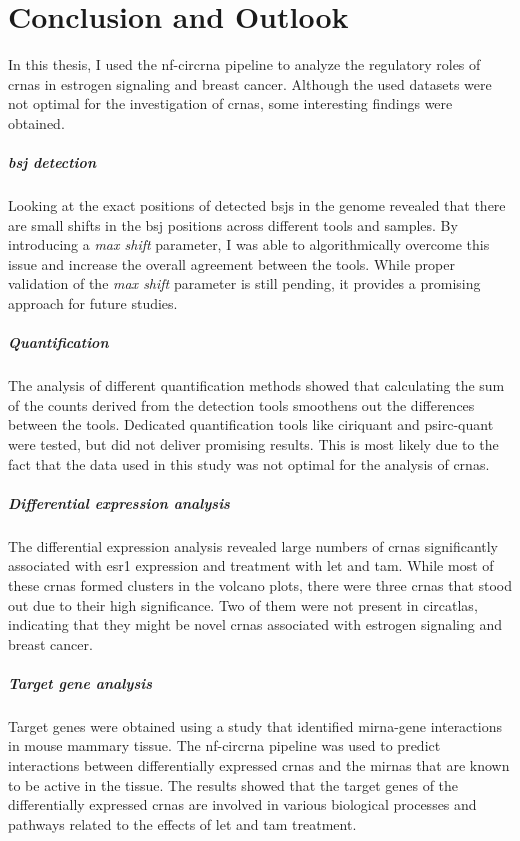 \chapter{Conclusion and Outlook}

In this thesis, I used the \gls{nf-circrna} pipeline to analyze the regulatory
roles of \glspl{crna} in estrogen signaling and breast cancer.
Although the used datasets were not optimal for the investigation of
\glspl{crna}, some interesting findings were obtained.

\paragraph{\Gls{bsj} detection}
Looking at the exact positions of detected \glspl{bsj} in the genome revealed
that there are small shifts in the \gls{bsj} positions across different tools
and samples.
By introducing a \textit{max shift} parameter, I was able to algorithmically
overcome this issue and increase the overall agreement between the tools.
While proper validation of the \textit{max shift} parameter is still pending,
it provides a promising approach for future studies.

\paragraph{Quantification}
The analysis of different quantification methods showed that calculating the
sum of the counts derived from the detection tools smoothens out the
differences between the tools.
Dedicated quantification tools like \gls{ciriquant} and \gls{psirc-quant} were
tested, but did not deliver promising results.
This is most likely due to the fact that the data used in this study was not
optimal for the analysis of \glspl{crna}.

\paragraph{Differential expression analysis}
The differential expression analysis revealed large numbers of \glspl{crna}
significantly associated with \gls{esr1} expression and treatment with
\gls{let} and \gls{tam}.
While most of these \glspl{crna} formed clusters in the volcano plots, there
were three \glspl{crna} that stood out due to their high significance.
Two of them were not present in \gls{circatlas}, indicating that they might be
novel \glspl{crna} associated with estrogen signaling and breast cancer.

\paragraph{Target gene analysis}
Target genes were obtained using a study that identified \gls{mirna}-gene
interactions in mouse mammary tissue. The \gls{nf-circrna} pipeline was used to
predict interactions between differentially expressed \glspl{crna} and the
\glspl{mirna} that are known to be active in the tissue.
The results showed that the target genes of the differentially expressed
\glspl{crna} are involved in various biological processes and pathways related
to the effects of \gls{let} and \gls{tam} treatment.
